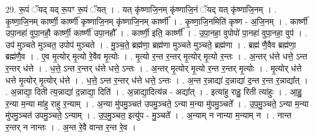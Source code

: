 \documentclass[17pt]{extarticle}
\begin{document}
29. रू॒पं ॅयद् यद् रू॒पꣳ रू॒पं ॅयत् । . यत् कृ॑ष्णाजि॒नम् कृ॑ष्णाजि॒नं ॅयद् यत् कृ॑ष्णाजि॒नम् । . कृ॒ष्णा॒जि॒नम् कार्ष्णी॒ कार्ष्णी॑ कृष्णाजि॒नम् कृ॑ष्णाजि॒नम् कार्ष्णी᳚ । . कृ॒ष्णा॒जि॒नमिति॑ कृष्ण - अ॒जि॒नम् । . कार्ष्णी॑ उपा॒नहा॑ वुपा॒नहौ॒ कार्ष्णी॒ कार्ष्णी॑ उपा॒नहौ᳚ । . कार्ष्णी॒ इति॒ कार्ष्णी᳚ । . उ॒पा॒नहा॒ वुपोपो॑ पा॒नहा॑ वुपा॒नहा॒ वुप॑ । . उप॑ मुञ्चते मुञ्चत॒ उपोप॑ मुञ्चते । . मु॒ञ्च॒ते॒ ब्रह्म॑णा॒ ब्रह्म॑णा मुञ्चते मुञ्चते॒ ब्रह्म॑णा । . ब्रह्म॑ णै॒वैव ब्रह्म॑णा॒ ब्रह्म॑णै॒व । . ए॒व मृ॒त्योर् मृ॒त्यो रे॒वैव मृ॒त्योः । . मृ॒त्यो र॒न्त र॒न्तर् मृ॒त्योर् मृ॒त्यो र॒न्तः । . अ॒न्तर् ध॑त्ते धत्ते॒ ऽन्त र॒न्तर् ध॑त्ते । . ध॒त्ते॒ ऽन्त र॒न्तर् ध॑त्ते धत्ते॒ ऽन्तः । . अ॒न्तर् मृ॒त्योर् मृ॒त्यो र॒न्त र॒न्तर् मृ॒त्योः । . मृ॒त्योर् ध॑त्ते धत्ते मृ॒त्योर् मृ॒त्योर् ध॑त्ते । . ध॒त्ते॒ ऽन्त र॒न्तर् ध॑त्ते धत्ते॒ ऽन्तः । . अ॒न्त र॒न्नाद्या॑ द॒न्नाद्या॑ द॒न्त र॒न्त र॒न्नाद्या᳚त् । . अ॒न्नाद्या॒ दिती त्य॒न्नाद्या॑ द॒न्नाद्या॒ दिति॑ । . अ॒न्नाद्या॒दित्य॑न्न - अद्या᳚त् । . इत्या॑हु राहु॒ रिती त्या॑हुः । . आ॒हु॒ र॒न्या म॒न्या मा॑हु राहु र॒न्याम् । . अ॒न्या मु॑पमु॒ञ्चत॑ उपमु॒ञ्चते॒ ऽन्या म॒न्या मु॑पमु॒ञ्चते᳚ । . उ॒प॒मु॒ञ्चते॒ ऽन्या म॒न्या मु॑पमु॒ञ्चत॑ उपमु॒ञ्चते॒ ऽन्याम् । . उ॒प॒मु॒ञ्चत॒ इत्यु॑प - मु॒ञ्चते᳚ । . अ॒न्याम् न नान्या म॒न्याम् न । . नान्त र॒न्तर् न नान्तः । . अ॒न्त रे॒वै वान्त र॒न्त रे॒व । \newline
\end{document}
